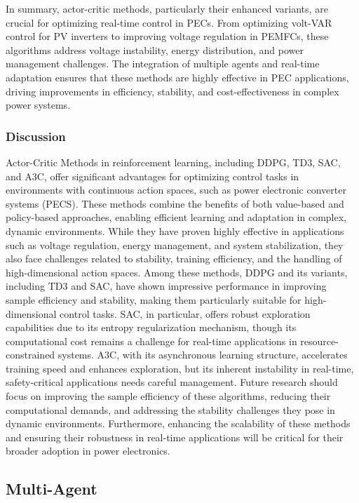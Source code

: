 In summary, actor-critic methods, particularly their enhanced variants, are crucial for optimizing real-time control in PECs. From optimizing volt-VAR control for PV inverters to improving voltage regulation in PEMFCs, these algorithms address voltage instability, energy distribution, and power management challenges. The integration of multiple agents and real-time adaptation ensures that these methods are highly effective in PEC applications, driving improvements in efficiency, stability, and cost-effectiveness in complex power systems.

\subsubsection{Discussion}

Actor-Critic Methods in reinforcement learning, including DDPG, TD3, SAC, and A3C, offer significant advantages for optimizing control tasks in environments with continuous action spaces, such as power electronic converter systems (PECS). These methods combine the benefits of both value-based and policy-based approaches, enabling efficient learning and adaptation in complex, dynamic environments. While they have proven highly effective in applications such as voltage regulation, energy management, and system stabilization, they also face challenges related to stability, training efficiency, and the handling of high-dimensional action spaces. Among these methods, DDPG and its variants, including TD3 and SAC, have shown impressive performance in improving sample efficiency and stability, making them particularly suitable for high-dimensional control tasks. SAC, in particular, offers robust exploration capabilities due to its entropy regularization mechanism, though its computational cost remains a challenge for real-time applications in resource-constrained systems. A3C, with its asynchronous learning structure, accelerates training speed and enhances exploration, but its inherent instability in real-time, safety-critical applications needs careful management. Future research should focus on improving the sample efficiency of these algorithms, reducing their computational demands, and addressing the stability challenges they pose in dynamic environments. Furthermore, enhancing the scalability of these methods and ensuring their robustness in real-time applications will be critical for their broader adoption in power electronics. 

\subsection{Multi-Agent}
\label{sec:ma_methods}

